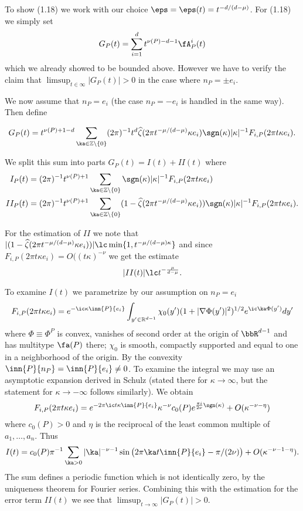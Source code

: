 To show (1.18) we work with our choice 
$\eps=\eps(t)= t^{-d/(d-\mu)}$.
For  (1.18) we simply set
$$G_{P}(t) =\sum_{i=1}^d t^{\nu(P)-d-1}\fA^i_P(t)$$
which we already showed to be bounded above. However we have to
verify  the claim that
 $\limsup_{t\in \infty} |G_P(t)|>0$
 in the case where  $n_P=\pm e_i$.


We now assume that $n_P =e_i$ (the case $n_P=-e_i$ is handled in the same 
  way). Then define

$$G_{P}(t) = 
t^{\nu(P)+1-d}
\sum_{\ka\in \Bbb Z\setminus\{0\}} (2\pi)^{-1} t^d\widehat 
\zeta(2\pi t^{-\mu/(d-\mu)}\kappa e_i) \sgn(\kappa)|\kappa|^{-1} 
F_{i,P}(2\pi t\kappa e_i).
$$


We split this sum into  parts $G_P(t)=I(t)+II(t)$ where
$$
\aligned
I_P(t) &=  (2\pi)^{-1} t^{\nu(P)+1}\sum_{\ka\in \Bbb Z\setminus\{0\}} 
 \sgn(\kappa)|\kappa|^{-1} 
F_{i,P}(2\pi t\kappa e_i)
\\
II_P(t) &=  (2\pi)^{-1} t^{\nu(P)+1}\sum_{\ka\in \Bbb Z\setminus\{0\}} 
(1-\widehat 
\zeta(2\pi t^{-\mu/(d-\mu)}\kappa e_i)) \sgn(\kappa)|\kappa|^{-1} 
F_{i,P}(2\pi t\kappa e_i).
\endaligned
$$

For the estimation of $II$ we note that
$|(1-\widehat \zeta(2\pi t^{-\mu/(d-\mu)}\kappa e_i))|\lc
\min\{1, t^{-\mu/(d-\mu)\kappa}\}
$
and since
$F_{i,P}(2\pi t\kappa e_i)=O((t\kappa)^{-\nu}$ we get the estimate
$$
|II(t)|\lc t^{-\frac{\mu}{d-\mu}}.
$$

To examine  $I(t)$ we parametrize 
 by our assumption on $n_P=e_i$  
$$
F_{i,P}(2\pi t\kappa e_i)= e^{-\ic\kappa \inn{P}{e_i}}
\int_{y'\in \Bbb R^{d-1}} \chi_0(y' ) (1+|\nabla \Phi(y')|^2)^{1/2}
e^{\ic\ka\Phi(y')} dy'
$$
where $\Phi\equiv \Phi^P$ is convex, vanishes of second order at the origin of $\bbR^{d-1}$
and has multitype $\fa(P)$ there; $\chi_0$ is smooth, compactly supported 
and equal to one in a neighborhood of the origin. By  the convexity
 $\inn{P}{n_P}=\inn{P}{e_i}\neq 0$.
To examine the integral we 
 may use an  asymptotic expansion  derived in Schulz \cite{26}
(stated there for $\kappa\to \infty$, but the statement for $\kappa\to -\infty$
follows similarly). We obtain
$$
F_{i,P}(2\pi t\kappa e_i)= e^{-2\pi \ic t\kappa \inn{P}{e_i}} \kappa^{-\nu} 
c_0 (P) e^{\frac{\pi i}{2\nu}\sgn(\kappa)} +O(\kappa^{-\nu-\eta})
$$
where $c_0(P)>0$ and $\eta$ is the reciprocal of the 
least common multiple of $a_1,\dots, a_n$. 
Thus
$$I(t) = c_0(P) \pi^{-1}
\sum_{\ka>0}|\ka|^{-\nu-1}\sin\big(2\pi \ka t\inn{P}{e_i}-\pi/(2\nu)\big)
+O(\kappa^{-\nu-1-\eta}).
$$
The sum defines a periodic function which is not identically zero, 
by the uniqueness theorem for Fourier series. 
Combining this with the estimation for the error term $II(t)$ we see that
$\limsup_{t\to \infty} |G_P(t)|>0$.
\enddemo



